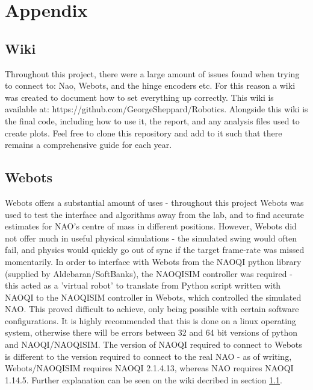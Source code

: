 \documentclass[11pt]{article}
\newcommand*\ruleline[1]{\par\noindent\raisebox{.8ex}{\makebox[\linewidth]{\hrulefill\hspace{1ex}\raisebox{-.8ex}{#1}\hspace{1ex}\hrulefill}}}
\begin{document}
\section{Appendix}
\subsection{Wiki} \label{sec:wiki}
\ruleline{George Sheppard}
Throughout this project, there were a large amount of issues found when trying to connect to: Nao, Webots, and the hinge encoders etc. For this reason a wiki was created to document how to set everything up correctly. This wiki is available at: https://github.com/GeorgeSheppard/Robotics. Alongside this wiki is the final code, including how to use it, the report, and any analysis files used to create plots. Feel free to clone this repository and add to it such that there remains a comprehensive guide for each year.

\subsection{Webots}
\ruleline{James Doering}
Webots offers a substantial amount of uses - throughout this project Webots was used to test the interface and algorithms away from the lab, and to find accurate estimates for NAO's centre of mass in different positions. However, Webots did not offer much in useful physical simulations - the simulated swing would often fail, and physics would quickly go out of sync if the target frame-rate was missed momentarily. In order to interface with Webots from the NAOQI python library (supplied by Aldebaran/SoftBanks), the NAOQISIM controller was required - this acted as a 'virtual robot' to translate from Python script written with NAOQI to the NAOQISIM controller in Webots, which controlled the simulated NAO. This proved difficult to achieve, only being possible with certain software configurations. It is highly recommended that this is done on a linux operating system, otherwise there will be errors between 32 and 64 bit versions of python and NAOQI/NAOQISIM. The version of NAOQI required to connect to Webots is different to the version required to connect to the real NAO - as of writing, Webots/NAOQISIM requires NAOQI 2.1.4.13, whereas NAO requires NAOQI 1.14.5. Further explanation can be seen on the wiki decribed in section \ref{sec:wiki}.



\end{document}
